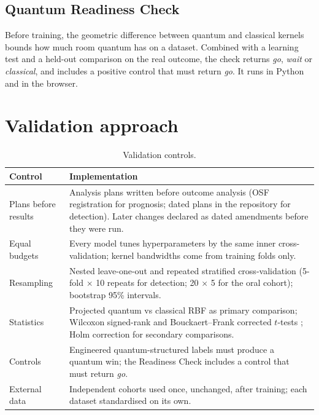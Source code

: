 \documentclass[11pt,a4paper]{article}
\begin{document}
\subsection{Quantum Readiness Check}
Before training, the geometric difference between quantum and classical kernels \cite{huang2021} bounds how much room quantum has on a dataset. Combined with a learning test and a held-out comparison on the real outcome, the check returns \emph{go}, \emph{wait} or \emph{classical}, and includes a positive control that must return \emph{go}. It runs in Python and in the browser.

\section{Validation approach}
\begin{table}[H]
\centering
\caption{Validation controls.}
\begin{tabularx}{\textwidth}{@{}l Y@{}}
\toprule
\textbf{Control} & \textbf{Implementation} \\
\midrule
Plans before results & Analysis plans written before outcome analysis (OSF registration for prognosis; dated plans in the repository for detection). Later changes declared as dated amendments before they were run. \\
Equal budgets & Every model tunes hyperparameters by the same inner cross-validation; kernel bandwidths come from training folds only. \\
Resampling & Nested leave-one-out and repeated stratified cross-validation (5-fold $\times$ 10 repeats for detection; 20 $\times$ 5 for the oral cohort); bootstrap 95\% intervals. \\
Statistics & Projected quantum vs classical RBF as primary comparison; Wilcoxon signed-rank and Bouckaert--Frank corrected $t$-tests \cite{bouckaert}; Holm correction for secondary comparisons. \\
Controls & Engineered quantum-structured labels must produce a quantum win; the Readiness Check includes a control that must return \emph{go}. \\
External data & Independent cohorts used once, unchanged, after training; each dataset standardised on its own. \\
\bottomrule
\end{tabularx}
\end{table}

\end{document}
